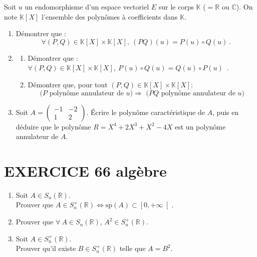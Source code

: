 \documentclass[10pt,oneside]{article}
\begin{document}
\begin{flushleft}
Soit $u$ un endomorphisme d'un espace vectoriel $E$ sur le corps $\mathbb{K}$ ($=\mathbb{R}$ ou $\mathbb{C}$). On note $\mathbb{K}[X]$ l'ensemble des polynômes à coefficients dans $\mathbb{K}$.
\begin{enumerate}
\item Démontrer que : 
\begin{equation*}
\forall (P,Q)\in \mathbb{K}[X]\times \mathbb{K}[X],~ (PQ)(u)=P(u)\circ Q(u)~.
\end{equation*}
\item \begin{enumerate}
	\item Démontrer que : $\forall (P,Q)\in \mathbb{K}[X]\times \mathbb{K}[X],~ P(u)\circ Q(u)=Q(u)\circ P(u)$~.
	\item Démontrer que, pour tout $(P,Q)\in \mathbb{K}[X]\times \mathbb{K}[X]$:
	\begin{equation*}
	\text{($P$ polynôme annulateur de $u$)$\Longrightarrow$ ($PQ$ polynôme annulateur de $u$)}
	\end{equation*}
	\end{enumerate}
\item Soit $A=\begin{pmatrix}
-1 & -2 \\ 
1 & 2
\end{pmatrix} $. Écrire le polynôme caractéristique de $A$, puis en déduire que le polynôme $R=X^4+2X^3+X^2-4X$ est un polynôme annulateur de $A$.
\end{enumerate}

		

\section*{EXERCICE 66 \: algèbre}


\begin{enumerate}
\item
Soit $A\in S_n\left( \mathbb{R}\right)$.\\
Prouver que $A\in S_n^+\left( \mathbb{R}\right)\Longleftrightarrow \mathrm{sp}(A)\subset \left[0,+\infty \right[$. 
\item
Prouver que $\forall\:A\in S_n\left( \mathbb{R}\right)$, $A^2\in S_n^+\left( \mathbb{R}\right)$.


\item
Soit $A\in S_n^+\left( \mathbb{R}\right)$.\\
Prouver qu'il existe $B\in S_n^+\left( \mathbb{R}\right)$ telle que $A=B^2$.


\end{enumerate}
\end{flushleft}
\end{document}
